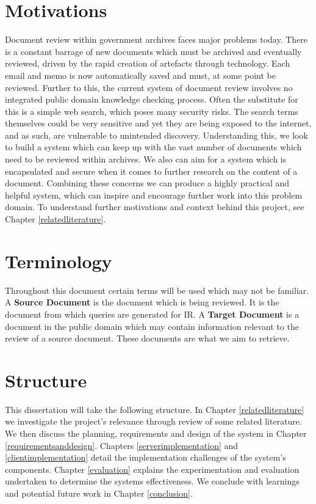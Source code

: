 \documentclass{l4proj}
\begin{document}
\section{Motivations}
Document review within government archives faces major problems today. There is a constant barrage of new documents which must be archived and eventually reviewed, driven by the rapid creation of artefacts through technology. Each email and memo is now automatically saved and must, at some point be reviewed.
Further to this, the current system of document review involves no integrated public domain knowledge checking process. Often the substitute for this is a simple web search, which poses many security risks. The search terms themselves could be very sensitive and yet they are being exposed to the internet, and as such, are vulnerable to unintended discovery.
Understanding this, we look to build a system which can keep up with the vast number of documents which need to be reviewed within archives. We also can aim for a system which is encapsulated and secure when it comes to further research on the content of a document.
Combining these concerns we can produce a highly practical and helpful system, which can inspire and encourage further work into this problem domain. To understand further motivations and context behind this project, see Chapter \ref{relatedliterature}.

\section{Terminology}
Throughout this document certain terms will be used which may not be familiar.
A \textbf{Source Document} is the document which is being reviewed. It is the document from which queries are generated for IR.
A \textbf{Target Document} is a document in the public domain which may contain information relevant to the review of a source document. These documents are what we aim to retrieve.

\section{Structure}
This dissertation will take the following structure.
In Chapter \ref{relatedliterature} we investigate the project's relevance through review of some related literature. We then discuss the planning, requirements and design of the system in Chapter \ref{requirementsanddesign}. Chapters \ref{serverimplementation} and \ref{clientimplementation} detail the implementation challenges of the system's components. Chapter \ref{evaluation} explains the experimentation and evaluation undertaken to determine the systems effectiveness. We conclude with learnings and potential future work in Chapter \ref{conclusion}.
\end{document}
